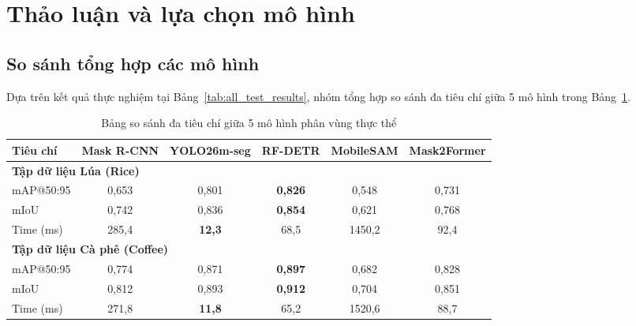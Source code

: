 
\section{Thảo luận và lựa chọn mô hình}
\label{sec:discussion}

\subsection{So sánh tổng hợp các mô hình}
\label{subsec:model_comparison}

Dựa trên kết quả thực nghiệm tại Bảng~\ref{tab:all_test_results}, nhóm tổng hợp so sánh đa tiêu chí giữa 5 mô hình trong Bảng~\ref{tab:model_comparison}.

\begin{table}[H]
    \caption{Bảng so sánh đa tiêu chí giữa 5 mô hình phân vùng thực thể}
    \centering
    \small
    \begin{tabular}{lccccc}
        \toprule
        \textbf{Tiêu chí} & \textbf{Mask R-CNN} & \textbf{YOLO26m-seg} & \textbf{RF-DETR} & \textbf{MobileSAM} & \textbf{Mask2Former} \\
        \midrule
        \multicolumn{6}{l}{\textbf{Tập dữ liệu Lúa (Rice)}}                                                                           \\
        \quad mAP@50:95   & 0,653               & 0,801                & \textbf{0,826}   & 0,548              & 0,731                \\
        \quad mIoU        & 0,742               & 0,836                & \textbf{0,854}   & 0,621              & 0,768                \\
        \quad Time (ms)   & 285,4               & \textbf{12,3}        & 68,5             & 1450,2             & 92,4                 \\
        \midrule
        \multicolumn{6}{l}{\textbf{Tập dữ liệu Cà phê (Coffee)}}                                                                      \\
        \quad mAP@50:95   & 0,774               & 0,871                & \textbf{0,897}   & 0,682              & 0,828                \\
        \quad mIoU        & 0,812               & 0,893                & \textbf{0,912}   & 0,704              & 0,851                \\
        \quad Time (ms)   & 271,8               & \textbf{11,8}        & 65,2             & 1520,6             & 88,7                 \\
        \bottomrule
    \end{tabular}
    \label{tab:model_comparison}
\end{table}

